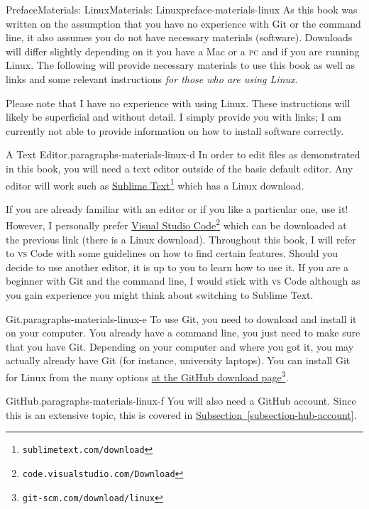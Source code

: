 \documentclass[oneside,10pt,]{book}
\newcommand{\xreffont}{\relax}
\newcommand{\initialism}[1]{\textsc{\MakeLowercase{#1}}}
\begin{document}
\begin{preface}{Preface}{Materials: Linux}{}{Materials: Linux}{}{}{preface-materials-linux}
As this book was written on the assumption that you have no experience with Git or the command line, it also assumes you do not have necessary materials (software). Downloads will differ slightly depending on it you have a Mac or a \initialism{PC} and if you are running Linux. The following will provide necessary materials to use this book as well as links and some relevant instructions \emph{for those who are using Linux}.%
\par
Please note that I have no experience with using Linux. These instructions will likely be superficial and without detail. I simply provide you with links; I am currently not able to provide information on how to install software correctly.%
\begin{paragraphs}{A Text Editor.}{paragraphs-materials-linux-d}%
In order to edit files as demonstrated in this book, you will need a text editor outside of the basic default editor. Any editor will work such as \href{https://www.sublimetext.com/download}{Sublime Text}\footnote{\nolinkurl{sublimetext.com/download}\label{fn-materials-linux-d-b-b}} which has a Linux download.%
\par
If you are already familiar with an editor or if you like a particular one, use it! However, I personally prefer \href{https:/code.visualstudio.com/Download}{Visual Studio Code}\footnote{\nolinkurl{code.visualstudio.com/Download}\label{fn-materials-linux-d-c-b}} which can be downloaded at the previous link (there is a Linux download). Throughout this book, I will refer to \initialism{VS} Code with some guidelines on how to find certain features. Should you decide to use another editor, it is up to you to learn how to use it. If you are a beginner with Git and the command line, I would stick with \initialism{VS} Code although as you gain experience you might think about switching to Sublime Text.%
\end{paragraphs}%
\begin{paragraphs}{Git.}{paragraphs-materials-linux-e}%
To use Git, you need to download and install it on your computer. You already have a command line, you just need to make sure that you have Git. Depending on your computer and where you got it, you may actually already have Git (for instance, university laptops). You can install Git for Linux from the many options \href{https://git-scm.com/download/linux}{at the GitHub download page}\footnote{\nolinkurl{git-scm.com/download/linux}\label{fn-materials-linux-e-b-b}}.%
\end{paragraphs}%
\begin{paragraphs}{GitHub.}{paragraphs-materials-linux-f}%
You will also need a GitHub account. Since this is an extensive topic, this is covered in \hyperref[subsection-hub-account]{Subsection~{\xreffont\ref{subsection-hub-account}}}.%
\end{paragraphs}%
\end{preface}
\end{document}
